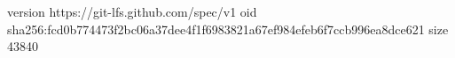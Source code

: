 version https://git-lfs.github.com/spec/v1
oid sha256:fcd0b774473f2bc06a37dee4f1f6983821a67ef984efeb6f7ccb996ea8dce621
size 43840
